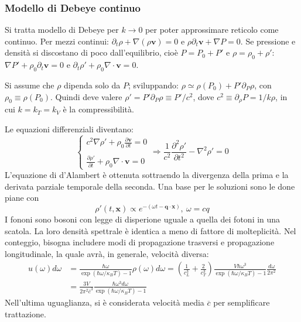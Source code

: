 \documentclass[10pt, a4paper]{scrartcl}
\numberwithin{equation}{subsection}
\theoremstyle{style1}
\begin{document}
\subsubsection{Modello di Debeye continuo}

Si tratta modello di Debeye per $k\to 0$ per poter approssimare reticolo come continuo. 
Per mezzi continui: $\partial _t \rho  + \nabla (\rho  \mathbf{v} ) = 0$ e $\rho  \partial _t \mathbf{ v}  + \nabla P = 0$.
Se pressione e densit\`a si discostano di poco dall'equilibrio, cio\`e $P = P_0 + P'$ e $\rho  = \rho _0 + \rho '$: $\nabla P' + \rho _0 \partial _t \mathbf{v} = 0$ e $\partial _t \rho ' + \rho _0 \nabla \cdot \mathbf{v} =0$.

Si assume che $\rho $ dipenda solo da $P$; sviluppando: $\rho \simeq \rho (P_0) + P'\partial _P \rho $, con $\rho _0 \equiv \rho (P_0)$. Quindi deve valere $\rho ' = P'\partial _P \rho  \equiv P ' / c^2$, dove $c^2 \equiv \partial _\rho P = 1 / k\rho $, in cui $k = k_T = k_V$ \`e la compressibilit\`a.

Le equazioni differenziali diventano:
\begin{equation}
	\begin{cases}
		\displaystyle c^2 \nabla  \rho  ' + \rho _0 \frac{\partial \mathbf{v} }{\partial t} = 0 \\
		\\
		 \displaystyle \frac{\partial \rho '}{\partial t} + \rho _0 \nabla \cdot \mathbf{v} = 0 
	\end{cases} \Longrightarrow \frac{1}{c^2}\frac{\partial ^2 \rho '}{\partial t^2} - \nabla ^2 \rho ' = 0
\end{equation}
L'equazione di d'Alambert \`e ottenuta sottraendo la divergenza della prima e la derivata parziale temporale della seconda.
Una base per le soluzioni sono le done piane con
\begin{equation}
	\rho '(t,\mathbf{x} ) \propto e^{- (\omega t - \mathbf{q} \cdot \mathbf{x} )} , \ \omega = cq
\end{equation}
I fononi sono bosoni con legge di disperione uguale a quella dei fotoni in una scatola.
La loro densit\`a spettrale \`e identica a meno di fattore di molteplicit\`a.
Nel conteggio, bisogna includere modi di propagazione trasversi e propagazione longitudinale, la quale avr\`a, in generale, velocit\`a diversa:
\begin{equation}
	\begin{split}
		u(\omega) d\omega &= \frac{\hbar \omega}{\exp(\hbar \omega/\kappa _B T) - 1} \rho (\omega) d\omega = \left(\frac{1}{c_L^3  }+\frac{2}{c_T ^3}\right) \frac{V\hbar \omega^3}{\exp(\hbar \omega / \kappa _B T)-1}\frac{d\omega}{2\pi^2}\\
		&= \frac{3V}{2\pi^2 \overline{c}^3} \frac{\hbar  \omega^3 d\omega}{\exp(\hbar \omega / \kappa _B T ) -1}
	\end{split}
\end{equation}
Nell'ultima uguaglianza, si \`e considerata velocit\`a media $\overline{c}$ per semplificare trattazione.
\end{document}
